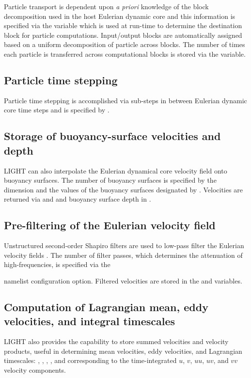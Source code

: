 Particle transport is dependent upon {\it a priori} knowledge of the block
decomposition used in the host Eulerian dynamic core and this information is
specified via the  variable which is used at run-time to
determine the destination block for particle computations.  Input/output blocks
are automatically assigned based on a uniform decomposition of particle across blocks.
The number of times each particle is transferred across computational blocks is 
stored via the  variable.

\subsection{Particle time stepping}

Particle time stepping is accomplished via sub-steps in between Eulerian dynamic core time steps
and is specified by .  

\subsection{Storage of buoyancy-surface velocities and depth}

LIGHT can also interpolate the Eulerian dynamical core velocity field onto buoyancy surfaces.
The number of buoyancy surfaces is specified by the dimension  and 
the values of the buoyancy surfaces designated by .  Velocities are 
returned via  and  and 
buoyancy surface depth in .

\subsection{Pre-filtering of the Eulerian velocity field}

Unstructured second-order Shapiro filters are used to low-pass filter the Eulerian velocity fields 
\citep{Wolfram_di15jpo, wolfram2013mitigating}.  The number of filter passes, which determines the 
attenuation of high-frequencies, is specified via the 

{\noindent}  namelist configuration option.  Filtered velocities are stored in the  and 
variables.


\subsection{Computation of Lagrangian mean, eddy velocities, and integral timescales}
LIGHT also provides the capability to store summed velocities and velocity
products, useful in determining mean velocities, eddy velocities, and
Lagrangian timescales: , , , ,
and  corresponding to the time-integrated $u$, $v$, $uu$, $uv$, and
$vv$ velocity components.

